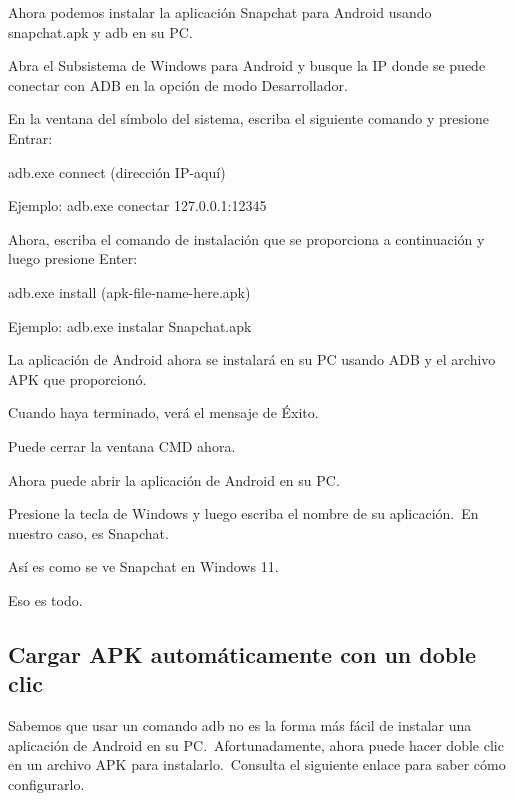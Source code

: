 \documentclass[
  a4paper,
]{article}
\begin{document}
Ahora podemos instalar la aplicación Snapchat para Android usando
snapchat.apk y adb en su PC.

Abra el Subsistema de Windows para Android y busque la IP donde se puede
conectar con ADB en la opción de modo Desarrollador.

En la ventana del símbolo del sistema, escriba el siguiente comando y
presione Entrar:

adb.exe connect (dirección IP-aquí)

Ejemplo: adb.exe conectar 127.0.0.1:12345

Ahora, escriba el comando de instalación que se proporciona a
continuación y luego presione Enter:

adb.exe install (apk-file-name-here.apk)

Ejemplo: adb.exe instalar Snapchat.apk

La aplicación de Android ahora se instalará en su PC usando ADB y el
archivo APK que proporcionó.

Cuando haya terminado, verá el mensaje de Éxito.

Puede cerrar la ventana CMD ahora.

Ahora puede abrir la aplicación de Android en su PC.

Presione la tecla de Windows y luego escriba el nombre de su
aplicación.~En nuestro caso, es Snapchat.

Así es como se ve Snapchat en Windows 11.

Eso es todo.

\hypertarget{cargar-apk-automuxe1ticamente-con-un-doble-clic}{%
\subsection{Cargar APK automáticamente con un doble
clic}\label{cargar-apk-automuxe1ticamente-con-un-doble-clic}}

Sabemos que usar un comando adb no es la forma más fácil de instalar una
aplicación de Android en su PC.~Afortunadamente, ahora puede hacer doble
clic en un archivo APK para instalarlo.~Consulta el siguiente enlace
para saber cómo configurarlo.


\printbibliography
\end{document}
